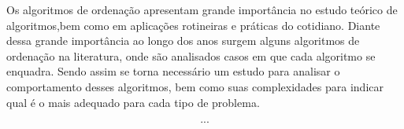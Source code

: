 \qquad Os algoritmos de ordenação apresentam grande importância no
estudo teórico de algoritmos,bem como em aplicações rotineiras e
práticas do cotidiano. Diante dessa grande importância ao longo dos
anos surgem alguns algoritmos de ordenação na literatura, onde são
analisados casos em que cada algoritmo se enquadra. Sendo assim se
torna necessário um estudo para analisar o comportamento desses
algoritmos, bem como suas complexidades para indicar qual é o mais
adequado para cada tipo de problema. 

\[...\]